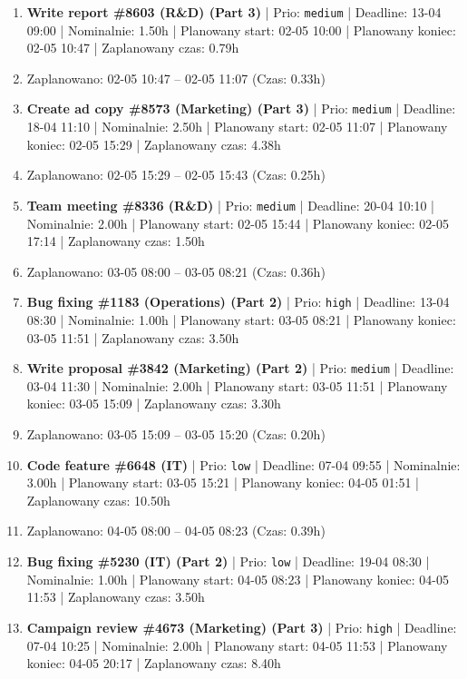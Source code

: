 {\begin{enumerate}
  \item [\textbf{14634}] \textbf{Write report \#8603 (R\&D) (Part 3)} | Prio: \texttt{medium} | Deadline: 13-04 09:00 | Nominalnie: 1.50h | Planowany start: 02-05 10:00 | Planowany koniec: 02-05 10:47 | Zaplanowany czas: 0.79h
  \item [\textbf{PRZERWA}] Zaplanowano: 02-05 10:47 -- 02-05 11:07 (Czas: 0.33h)
  \item [\textbf{14677}] \textbf{Create ad copy \#8573 (Marketing) (Part 3)} | Prio: \texttt{medium} | Deadline: 18-04 11:10 | Nominalnie: 2.50h | Planowany start: 02-05 11:07 | Planowany koniec: 02-05 15:29 | Zaplanowany czas: 4.38h
  \item [\textbf{PRZERWA}] Zaplanowano: 02-05 15:29 -- 02-05 15:43 (Czas: 0.25h)
  \item [\textbf{14649}] \textbf{Team meeting \#8336 (R\&D)} | Prio: \texttt{medium} | Deadline: 20-04 10:10 | Nominalnie: 2.00h | Planowany start: 02-05 15:44 | Planowany koniec: 02-05 17:14 | Zaplanowany czas: 1.50h
  \item [\textbf{PRZERWA}] Zaplanowano: 03-05 08:00 -- 03-05 08:21 (Czas: 0.36h)
  \item [\textbf{14613}] \textbf{Bug fixing \#1183 (Operations) (Part 2)} | Prio: \texttt{high} | Deadline: 13-04 08:30 | Nominalnie: 1.00h | Planowany start: 03-05 08:21 | Planowany koniec: 03-05 11:51 | Zaplanowany czas: 3.50h
  \item [\textbf{14673}] \textbf{Write proposal \#3842 (Marketing) (Part 2)} | Prio: \texttt{medium} | Deadline: 03-04 11:30 | Nominalnie: 2.00h | Planowany start: 03-05 11:51 | Planowany koniec: 03-05 15:09 | Zaplanowany czas: 3.30h
  \item [\textbf{PRZERWA}] Zaplanowano: 03-05 15:09 -- 03-05 15:20 (Czas: 0.20h)
  \item [\textbf{14683}] \textbf{Code feature \#6648 (IT)} | Prio: \texttt{low} | Deadline: 07-04 09:55 | Nominalnie: 3.00h | Planowany start: 03-05 15:21 | Planowany koniec: 04-05 01:51 | Zaplanowany czas: 10.50h
  \item [\textbf{PRZERWA}] Zaplanowano: 04-05 08:00 -- 04-05 08:23 (Czas: 0.39h)
  \item [\textbf{14680}] \textbf{Bug fixing \#5230 (IT) (Part 2)} | Prio: \texttt{low} | Deadline: 19-04 08:30 | Nominalnie: 1.00h | Planowany start: 04-05 08:23 | Planowany koniec: 04-05 11:53 | Zaplanowany czas: 3.50h
  \item [\textbf{14625}] \textbf{Campaign review \#4673 (Marketing) (Part 3)} | Prio: \texttt{high} | Deadline: 07-04 10:25 | Nominalnie: 2.00h | Planowany start: 04-05 11:53 | Planowany koniec: 04-05 20:17 | Zaplanowany czas: 8.40h

\end{enumerate}}
